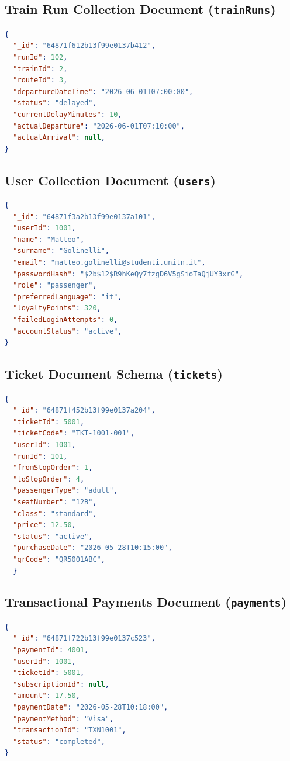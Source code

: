 \documentclass{article}
\begin{document}
\subsection{Train Run Collection Document (\texttt{trainRuns})}
\begin{lstlisting}[language=json]
{
  "_id": "64871f612b13f99e0137b412",
  "runId": 102,
  "trainId": 2,
  "routeId": 3,
  "departureDateTime": "2026-06-01T07:00:00",
  "status": "delayed",
  "currentDelayMinutes": 10,
  "actualDeparture": "2026-06-01T07:10:00",
  "actualArrival": null,
}
\end{lstlisting}

\subsection{User Collection Document (\texttt{users})}
\begin{lstlisting}[language=json]
{
  "_id": "64871f3a2b13f99e0137a101",
  "userId": 1001,
  "name": "Matteo",
  "surname": "Golinelli",
  "email": "matteo.golinelli@studenti.unitn.it",
  "passwordHash": "$2b$12$R9hKeQy7fzgD6V5gSioTaQjUY3xrG",
  "role": "passenger",
  "preferredLanguage": "it",
  "loyaltyPoints": 320,
  "failedLoginAttempts": 0,
  "accountStatus": "active",
}
\end{lstlisting}

\subsection{Ticket Document Schema (\texttt{tickets})}
\begin{lstlisting}[language=json]
{
  "_id": "64871f452b13f99e0137a204",
  "ticketId": 5001,
  "ticketCode": "TKT-1001-001",
  "userId": 1001,
  "runId": 101,
  "fromStopOrder": 1,
  "toStopOrder": 4,
  "passengerType": "adult",
  "seatNumber": "12B",
  "class": "standard",
  "price": 12.50,
  "status": "active",
  "purchaseDate": "2026-05-28T10:15:00",
  "qrCode": "QR5001ABC",
  }
\end{lstlisting}

\subsection{Transactional Payments Document (\texttt{payments})}
\begin{lstlisting}[language=json]
{
  "_id": "64871f722b13f99e0137c523",
  "paymentId": 4001,
  "userId": 1001,
  "ticketId": 5001,
  "subscriptionId": null,
  "amount": 17.50,
  "paymentDate": "2026-05-28T10:18:00",
  "paymentMethod": "Visa",
  "transactionId": "TXN1001",
  "status": "completed",
}
\end{lstlisting}
\end{document}
